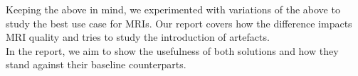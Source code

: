 
Keeping the above in mind, we experimented with variations of the above to study the best use case for MRIs. Our report covers how the difference impacts MRI quality and tries to study the introduction of artefacts.\\

In the report, we aim to show the usefulness of both solutions and how they stand against their baseline counterparts.



